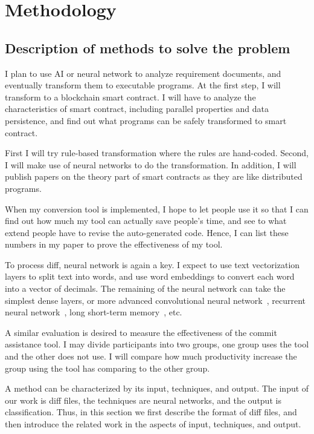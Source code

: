 \chapter{Methodology}


\section{Description of methods to solve the problem}

I plan to use AI or neural network to analyze requirement documents, and eventually transform them to executable programs.
At the first step, I will transform to a blockchain smart contract.
I will have to analyze the characteristics of smart contract, including parallel properties and data persistence, and find out what programs can be safely transformed to smart contract.

First I will try rule-based transformation where the rules are hand-coded. Second, I will make use of neural networks to do the transformation. In addition, I will publish papers on the theory part of smart contracts as they are like distributed programs.

When my conversion tool is implemented, I hope to let people use it so that I can find out how much my tool can actually save people's time, and see to what extend people have to revise the auto-generated code. Hence, I can list these numbers in my paper to prove the effectiveness of my tool.


To process diff, neural network is again a key. I expect to use text vectorization layers to split text into words, and use word embeddings to convert each word into a vector of decimals.
The remaining of the neural network can take the simplest dense layers, or more advanced convolutional neural network~\cite{albawi2017understanding}, recurrent neural network~\cite{tarwani2017survey}, long short-term memory~\cite{skovajsova2017long}, etc.

A similar evaluation is desired to measure the effectiveness of the commit assistance tool. I may divide participants into two groups, one group uses the tool and the other does not use. I will compare how much productivity increase the group using the tool has comparing to the other group.


A method can be characterized by its input, techniques, and output.
The input of our work is diff files, the techniques are neural networks, and the output is classification.
Thus, in this section we first describe the format of diff files, and then introduce the related work in the aspects of input, techniques, and output.




